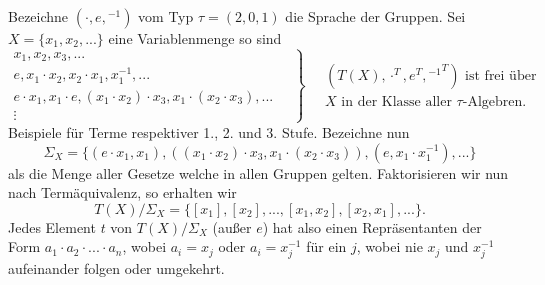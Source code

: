 \begin{example}
    Bezeichne $(\cdot, e, {}^{-1})$ vom Typ $\tau = (2,0,1)$ die Sprache der Gruppen. Sei $X = \{ x_1, x_2, ... \}$ eine Variablenmenge so sind
    $$ \left. \begin{matrix} x_1, x_2, x_3, ... \\ e, x_1 \cdot x_2, x_2 \cdot x_1, x_1^{-1}, ... \\ e \cdot x_1, x_1 \cdot e, (x_1 \cdot x_2) \cdot x_3, x_1 \cdot (x_2 \cdot x_3), ... \\ \vdots \end{matrix} \quad \right\} \quad \begin{matrix} (T(X), \cdot^T, e^T, {{}^{-1}}^T) \textrm{ ist frei über} \\ X \textrm{ in der Klasse aller $\tau$-Algebren.} \end{matrix} $$
    Beispiele für Terme respektiver 1., 2. und 3. Stufe. Bezeichne nun
    $$ \Sigma_X = \{ (e \cdot x_1, x_1), ((x_1 \cdot x_2) \cdot x_3, x_1 \cdot (x_2 \cdot x_3)), (e, x_1 \cdot x_1^{-1}), ... \} $$
    als die Menge aller Gesetze welche in allen Gruppen gelten. Faktorisieren wir nun nach Term\-äquivalenz, so erhalten wir
    $$ T(X) / \Sigma_X = \{ [x_1], [x_2], ..., [x_1, x_2], [x_2, x_1], ... \}. $$
    Jedes Element $t$ von $T(X) / \Sigma_X$ (außer $e$) hat also einen Repräsentanten der Form $a_1 \cdot a_2 \cdot ... \cdot a_n$, wobei $a_i = x_j$ oder $a_i = x_j^{-1}$ für ein $j$, wobei nie $x_j$ und $x_j^{-1}$ aufeinander folgen oder umgekehrt.
\end{example}